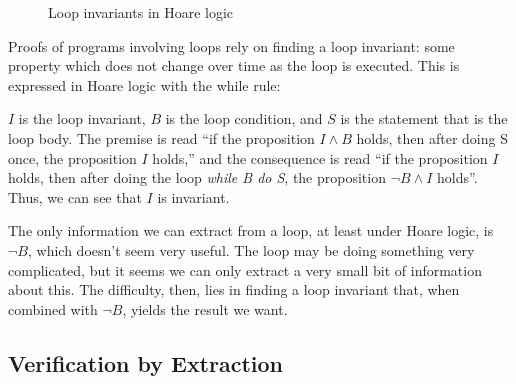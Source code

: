 \begin{figure}[t]
  \centering
  \begin{prooftree}



  \end{prooftree}
  \caption{Loop invariants in Hoare logic}
  \label{fig:exmpl:lit-embedding-loop}
\end{figure}

Proofs of programs involving loops rely on finding a loop invariant:
some property which does not change over time as the loop is
executed\cite{Hoare69}. This is expressed in Hoare logic with the
while rule:

\begin{prooftree}
\end{prooftree}

$I$ is the loop invariant, $B$ is the loop condition, and $S$ is the
statement that is the loop body. The premise is read ``if the
proposition $I \land B$ holds, then after doing S once, the
proposition $I$ holds,'' and the consequence is read ``if the
proposition $I$ holds, then after doing the loop \textit{while B do
  S}, the proposition $\lnot B \land I$ holds''. Thus, we can see that
$I$ is invariant.

The only information we can extract from a loop, at least under Hoare
logic, is $\lnot B$, which doesn't seem very useful. The loop may be
doing something very complicated, but it seems we can only extract a
very small bit of information about this. The difficulty, then, lies
in finding a loop invariant that, when combined with $\lnot B$, yields
the result we want.

\subsection{Verification by Extraction}
\label{sec:lit-verification-extraction}

